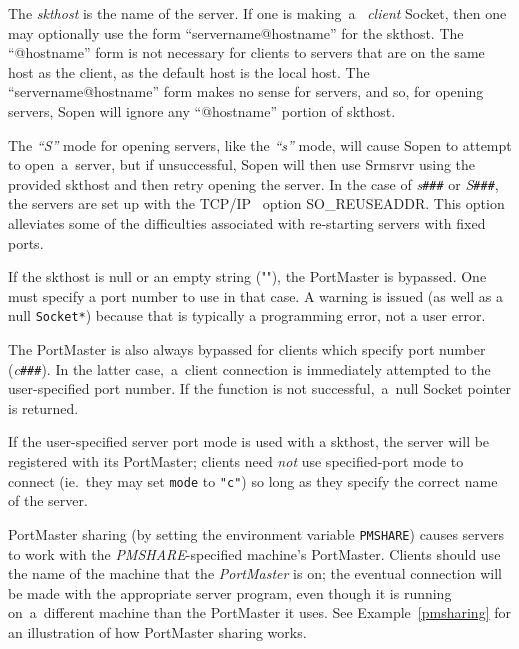 \documentclass[12pt]{article}
\def\TCP{{\small TCP/IP }}
\begin{document}
\begin{description}
    The {\em skthost} is the name of the server.  If one is making~a~{\em
    client} Socket, then one may optionally use the form
    ``servername@hostname'' for the skthost.  The ``@hostname'' form is not
    necessary for clients to servers that are on the same host as the client,
    as the default host is the local host.  The ``servername@hostname'' form
    makes no sense for servers, and so, for opening servers, Sopen will ignore
    any ``@hostname'' portion of skthost.

    The {\em ``S''} mode for opening servers, like the {\em ``s''} mode, will
    cause Sopen to attempt to open~a~server, but if unsuccessful, Sopen will
    then use Srmsrvr using the provided skthost and then retry opening the
    server.  In the case of {\em s\verb`###`} or {\em S\verb`###`}, the servers
    are set up with the \TCP\ option {\small SO\_REUSEADDR}.  This option
    alleviates some of the difficulties associated with re-starting servers
    with fixed ports.

    If the skthost is null or an empty string (""), the PortMaster is bypassed.
    One must specify a port number to use in that case.  A warning is issued
    (as well as a null \verb`Socket*`) because that is typically a programming
    error, not a user error.

    The PortMaster is also always bypassed for clients which specify port
    number ({\em c\verb`###`}).  In the latter case,~a~client connection is
    immediately attempted to the user-specified port number.  If the function
    is not successful,~a~null Socket pointer is returned.

    If the user-specified server port mode is used with a skthost, the server
    will be registered with its PortMaster; clients need {\em not} use
    specified-port mode to connect (ie.~they may set \verb`mode` to \verb`"c"`)
    so long as they specify the correct name of the server.

    PortMaster sharing (by setting the environment variable \verb`PMSHARE`)
    causes servers to work with the {\em\small PMSHARE\/}-specified
    machine's PortMaster.  Clients should use the name of the machine that
    the {\em PortMaster} is on; the eventual connection will be made with the
    appropriate server program, even though it is running on~a~different
    machine than the PortMaster it uses. See Example~\ref{pmsharing} for
    an illustration of how PortMaster sharing works.


\end{description}
\end{document}
